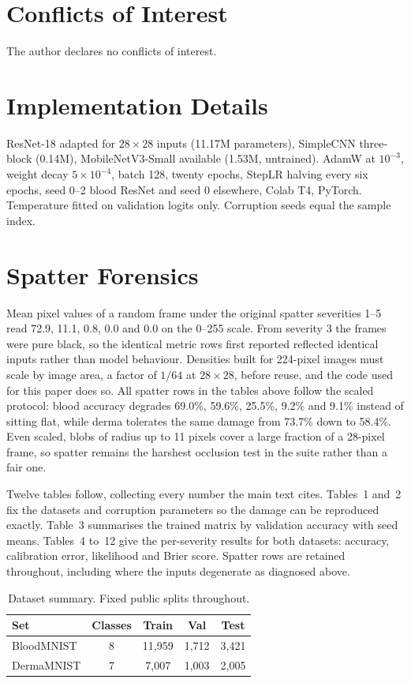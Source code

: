 \documentclass[a4paper,11pt,en,citestyle=authoryear,bibstyle=authoryear]{elegantpaper}
\begin{document}
\section*{Conflicts of Interest}
The author declares no conflicts of interest.

\appendix
\section{Implementation Details}
ResNet-18 adapted for $28\times28$ inputs (11.17M parameters), SimpleCNN three-block (0.14M), MobileNetV3-Small available (1.53M, untrained). AdamW \parencite{loshchilov2019} at $10^{-3}$, weight decay $5\times10^{-4}$, batch 128, twenty epochs, StepLR halving every six epochs, seed 0--2 blood ResNet and seed 0 elsewhere, Colab T4, PyTorch. Temperature fitted on validation logits only. Corruption seeds equal the sample index.
\section{Spatter Forensics}
\label{app:spatter}
Mean pixel values of a random frame under the original spatter severities 1--5 read 72.9, 11.1, 0.8, 0.0 and 0.0 on the 0--255 scale. From severity 3 the frames were pure black, so the identical metric rows first reported reflected identical inputs rather than model behaviour. Densities built for 224-pixel images must scale by image area, a factor of $1/64$ at $28\times28$, before reuse, and the code used for this paper does so. All spatter rows in the tables above follow the scaled protocol: blood accuracy degrades 69.0\%, 59.6\%, 25.5\%, 9.2\% and 9.1\% instead of sitting flat, while derma tolerates the same damage from 73.7\% down to 58.4\%. Even scaled, blobs of radius up to 11 pixels cover a large fraction of a 28-pixel frame, so spatter remains the harshest occlusion test in the suite rather than a fair one.

Twelve tables follow, collecting every number the main text cites. Tables~1 and~2 fix the datasets and corruption parameters so the damage can be reproduced exactly. Table~3 summarises the trained matrix by validation accuracy with seed means. Tables~4 to~12 give the per-severity results for both datasets: accuracy, calibration error, likelihood and Brier score. Spatter rows are retained throughout, including where the inputs degenerate as diagnosed above.

\begin{table}[H]
  \centering
  \caption{Dataset summary. Fixed public splits throughout.}
  \label{tab:data}
  \begin{tabular}{lcccc}
    \toprule
    Set & Classes & Train & Val & Test \\
    \midrule
    BloodMNIST & 8 & 11,959 & 1,712 & 3,421 \\
    DermaMNIST & 7 & 7,007 & 1,003 & 2,005 \\
    \bottomrule
  \end{tabular}
\end{table}
\end{document}
